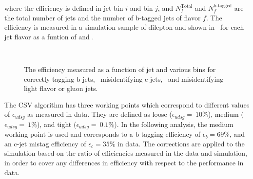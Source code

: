 where the efficiency is defined in jet \pt bin $i$ and \eta bin $j$, and $N_{f}^{\text{Total}}$ and $N_{f}^{\textrm{b-tagged}}$ are the total number of jets and the number of b-tagged jets of flavor $f$. The efficiency is measured in a simulation sample of dilepton \ttbar and shown in~ for each jet flavor as a funtion of \pt and \eta.

\begin{figure}
  \\
  \caption{The efficiency measured as a function of jet \pt and various \eta bins for~\protect{} correctly tagging b jets,~\protect{} misidentifying c jets,~\protect{} and misidentifying light flavor or gluon jets.}
  \label{fig:btageff}
\end{figure}

The CSV algorithm has three working points which correspond to different values of $\epsilon_{udsg}$ as measured in data. They are defined as loose ($\epsilon_{udsg}=~10\%$), medium ($\epsilon_{udsg}=~1\%$), and tight ($\epsilon_{udsg}=~0.1\%$). In the following analysis, the medium working point is used and corresponds to a b-tagging efficiency of $\epsilon_{b}=69\%$, and an c-jet mistag efficiency of $\epsilon_{c}=35\%$ in data. The corrections are applied to the simulation based on the ratio of efficiencies measured in the data and simulation, in order to cover any differences in efficiency with respect to the performance in data.

